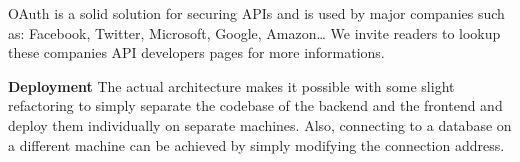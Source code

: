 OAuth is a solid solution for securing APIs and is used by major companies such as:
Facebook, Twitter, Microsoft, Google, Amazon\ldots
We invite readers to lookup these companies API developers pages for more
informations.

\textbf{Deployment}\newline
The actual architecture makes it possible with some slight refactoring to simply separate
the codebase of the backend and the frontend and deploy them individually on separate machines.
Also, connecting to a database on a different machine can be achieved by simply
modifying the connection address.